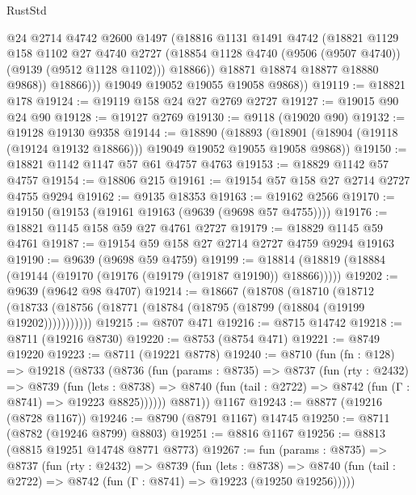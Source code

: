 \begin{lexlean}{RustStd}
\begin{coremodule}
                  @24
                  @2714
                  @4742
                  @2600
                  @1497
                  (@18816
                    @1131
                    @1491
                    @4742
                    (@18821
                      @1129
                      @158
                      @1102
                      @27
                      @4740
                      @2727
                      (@18854 @1128 @4740 (@9506 (@9507 @4740)) (@9139 (@9512 @1128 @1102)))
                      @18866))
                  @18871
                  @18874
                  @18877
                  @18880
                  @9868))
              @18866)))
        @19049
        @19052
        @19055
        @19058
        @9868))
@19119 := @18821 @178
@19124 := @19119 @158 @24 @27 @2769 @2727
@19127 := @19015 @90 @24 @90
@19128 := @19127 @2769
@19130 := @9118 (@19020 @90)
@19132 := @19128 @19130 @9358
@19144 := @18890
    (@18893 (@18901 (@18904 (@19118 (@19124 @19132 @18866))) @19049 @19052 @19055 @19058 @9868))
@19150 := @18821 @1142 @1147 @57 @61 @4757 @4763
@19153 := @18829 @1142 @57 @4757
@19154 := @18806 @215
@19161 := @19154 @57 @158 @27 @2714 @2727 @4755 @9294
@19162 := @9135 @18353
@19163 := @19162 @2566
@19170 := @19150 (@19153 (@19161 @19163 (@9639 (@9698 @57 @4755))))
@19176 := @18821 @1145 @158 @59 @27 @4761 @2727
@19179 := @18829 @1145 @59 @4761
@19187 := @19154 @59 @158 @27 @2714 @2727 @4759 @9294 @19163
@19190 := @9639 (@9698 @59 @4759)
@19199 := @18814 (@18819 (@18884 (@19144 (@19170 (@19176 (@19179 (@19187 @19190)) @18866)))))
@19202 := @9639 (@9642 @98 @4707)
@19214 := @18667
    (@18708
      (@18710
        (@18712 (@18733 (@18756 (@18771 (@18784 (@18795 (@18799 (@18804 (@19199 @19202)))))))))))
@19215 := @8707 @471
@19216 := @8715 @14742
@19218 := @8711 (@19216 @8730)
@19220 := @8753 (@8754 @471)
@19221 := @8749 @19220
@19223 := @8711 (@19221 @8778)
@19240 := @8710
    (fun (fn : @128) =>
    @19218
      (@8733
        (@8736
          (fun (params : @8735) =>
          @8737
            (fun (rty : @2432) =>
            @8739
              (fun (lets : @8738) =>
              @8740 (fun (tail : @2722) => @8742 (fun (Γ : @8741) => @19223 @8825))))))
        @8871))
    @1167
@19243 := @8877 (@19216 (@8728 @1167))
@19246 := @8790 (@8791 @1167) @14745
@19250 := @8711 (@8782 (@19246 @8799) @8803)
@19251 := @8816 @1167
@19256 := @8813 (@8815 @19251 @14748 @8771 @8773)
@19267 := fun (params : @8735) =>
  @8737
    (fun (rty : @2432) =>
    @8739
      (fun (lets : @8738) =>
      @8740 (fun (tail : @2722) => @8742 (fun (Γ : @8741) => @19223 (@19250 @19256)))))

\end{coremodule}
\end{lexlean}
